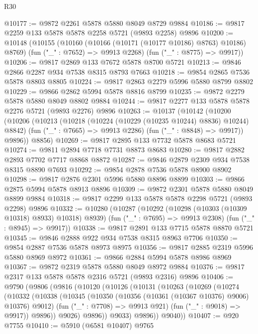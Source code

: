 \begin{lexlean}{R30}
\begin{coremodule}
@10177 := @9872 @2261 @5878 @5880 @8049 @8729 @9884
@10186 := @9817 @2259 @133 @5878 @5878 @2258 @5721 (@9893 @2258) @9896
@10200 := @10148
    (@10155
      (@10160 (@10166 (@10171 (@10177 @10186) @8763) @10186) @8769)
      (fun ("_" : @7652) => @9913 @2268)
      (fun ("_" : @8775) => @9917))
@10206 := @9817 @2869 @133 @7672 @5878 @8700 @5721
@10213 := @9846 @2866 @2287 @934 @7538 @8315 @8793 @7663
@10218 := @9854 @2865 @7536 @5878 @8803 @8805
@10224 := @9817 @2863 @2279 @5996 @5880 @8799 @8802
@10229 := @9866 @2862 @5994 @5878 @8816 @8799
@10235 := @9872 @2279 @5878 @5880 @8049 @8802 @9884
@10244 := @9817 @2277 @133 @5878 @5878 @2276 @5721 (@9893 @2276) @9896
@10263 := @10137
    (@10142
      (@10200
        (@10206
          (@10213
            (@10218 (@10224 (@10229 (@10235 @10244) @8836) @10244) @8842)
            (fun ("_" : @7665) => @9913 @2286)
            (fun ("_" : @8848) => @9917))
          @9896))
      @8856)
@10269 := @9817 @2895 @133 @7732 @5878 @8683 @5721
@10274 := @9811 @2894 @7718 @7731 @8873 @8683
@10280 := @9817 @2882 @2893 @7702 @7717 @8868 @8872
@10287 := @9846 @2879 @2309 @934 @7538 @8315 @8890 @7693
@10292 := @9854 @2878 @7536 @5878 @8900 @8902
@10298 := @9817 @2876 @2301 @5996 @5880 @8896 @8899
@10303 := @9866 @2875 @5994 @5878 @8913 @8896
@10309 := @9872 @2301 @5878 @5880 @8049 @8899 @9884
@10318 := @9817 @2299 @133 @5878 @5878 @2298 @5721 (@9893 @2298) @9896
@10332 := @10280
    (@10287
      (@10292 (@10298 (@10303 (@10309 @10318) @8933) @10318) @8939)
      (fun ("_" : @7695) => @9913 @2308)
      (fun ("_" : @8945) => @9917))
@10338 := @9817 @2891 @133 @7715 @5878 @8870 @5721
@10345 := @9846 @2888 @922 @934 @7538 @8315 @8963 @7706
@10350 := @9854 @2887 @7536 @5878 @8973 @8975
@10356 := @9817 @2885 @2319 @5996 @5880 @8969 @8972
@10361 := @9866 @2884 @5994 @5878 @8986 @8969
@10367 := @9872 @2319 @5878 @5880 @8049 @8972 @9884
@10376 := @9817 @2317 @133 @5878 @5878 @2316 @5721 (@9893 @2316) @9896
@10406 := @9790
    (@9806
      (@9816
        (@10120
          (@10126
            (@10131
              (@10263
                (@10269
                  (@10274
                    (@10332
                      (@10338
                        (@10345
                          (@10350 (@10356 (@10361 (@10367 @10376) @9006) @10376) @9012)
                          (fun ("_" : @7708) => @9913 @921)
                          (fun ("_" : @9018) => @9917))
                        @9896))
                    @9026)
                  @9896))
              @9033)
            @9896))
        @9040))
@10407 := @920 @7755
@10410 := @5910 (@6581 @10407) @9765

\end{coremodule}
\end{lexlean}
